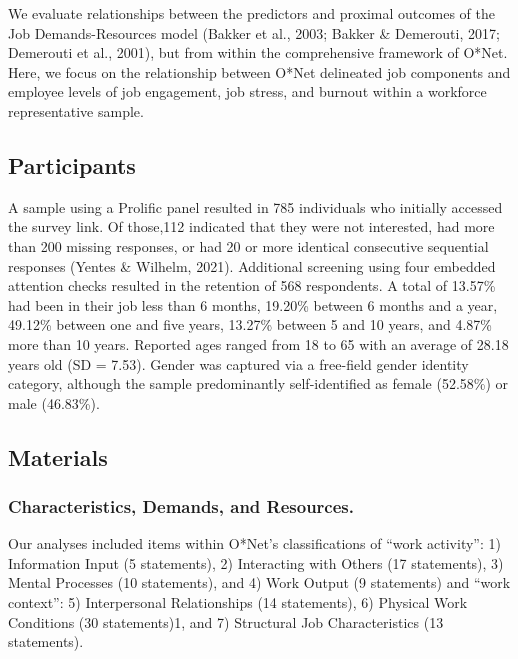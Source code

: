 \documentclass[
  man]{apa6}
\begin{document}
We evaluate relationships between the predictors and proximal outcomes of the Job Demands-Resources model (Bakker et al., 2003; Bakker \& Demerouti, 2017; Demerouti et al., 2001), but from within the comprehensive framework of O*Net. Here, we focus on the relationship between O*Net delineated job components and employee levels of job engagement, job stress, and burnout within a workforce representative sample.

\hypertarget{participants}{%
\subsection{Participants}\label{participants}}

A sample using a Prolific panel resulted in 785 individuals who initially accessed the survey link. Of those,112 indicated that they were not interested, had more than 200 missing responses, or had 20 or more identical consecutive sequential responses (Yentes \& Wilhelm, 2021). Additional screening using four embedded attention checks resulted in the retention of 568 respondents. A total of 13.57\% had been in their job less than 6 months, 19.20\% between 6 months and a year, 49.12\% between one and five years, 13.27\% between 5 and 10 years, and 4.87\% more than 10 years. Reported ages ranged from 18 to 65 with an average of 28.18 years old (SD = 7.53). Gender was captured via a free-field gender identity category, although the sample predominantly self-identified as female (52.58\%) or male (46.83\%).

\hypertarget{materials}{%
\subsection{Materials}\label{materials}}

\hypertarget{characteristics-demands-and-resources.}{%
\subsubsection{Characteristics, Demands, and Resources.}\label{characteristics-demands-and-resources.}}

Our analyses included items within O*Net's classifications of ``work activity'': 1) Information Input (5 statements), 2) Interacting with Others (17 statements), 3) Mental Processes (10 statements), and 4) Work Output (9 statements) and ``work context'': 5) Interpersonal Relationships (14 statements), 6) Physical Work Conditions (30 statements)1, and 7) Structural Job Characteristics (13 statements).
\end{document}
